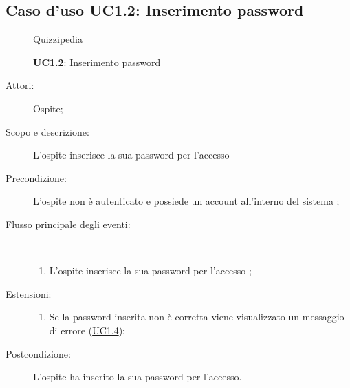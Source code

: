 \subsection{Caso d'uso UC1.2: Inserimento password}
	\begin{figure}[H]
		\centering
		\begin{resizedtikzpicture}{\textwidth}
		\begin{umlsystem}[x=0, fill=lightgray!20]{Quizzipedia}
		\end{umlsystem}
		\end{resizedtikzpicture}
		\caption{\textbf{UC1.2}: Inserimento password}
		\label{UC1.2}
	\end{figure}
\begin{description}
\item[Attori:] Ospite;
\item[Scopo e descrizione:] L'ospite inserisce la sua password per l'accesso
      \item[Precondizione:] L'ospite non è autenticato e possiede un account all'interno del sistema
;

        \item[Flusso principale degli eventi:] \ 
 \begin{enumerate}
          \item L'ospite inserisce la sua password per l'accesso
;

      \end{enumerate}
    \item[Estensioni:]
      \begin{enumerate}
          \item Se la password inserita non è corretta viene visualizzato un messaggio di errore (\hyperlink{UC1.4}{UC1.4});

      \end{enumerate}
    \item[Postcondizione:] L'ospite ha inserito la sua password per l'accesso.
  \end{description}
\hypertarget{UC1.3}{}
